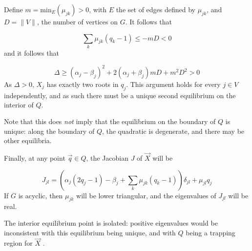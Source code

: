 \documentclass{article}
\begin{document}
Define $m = \mathrm{min}_E(\mu_{jk}) > 0$, with $E$ the set of edges defined by
$\mu_{jk}$, and $D = \|V\|$, the number of vertices on $G$. It follows that

\begin{equation}
    \sum_k \mu_{jk} (q_k - 1) \leq - m D < 0
\end{equation}
and it follows that

\begin{equation}
    \Delta \geq (\alpha_j - \beta_j)^2 + 2 (\alpha_j + \beta_j) m D + m^2 D^2 > 0
\end{equation}
As $\Delta > 0$, $X_j$ has exactly two roots in $q_j$. This argument holds for every
$j \in V$ independently, and as such there must be a unique second equilibrium on the
interior of $Q$.

Note that this does \emph{not} imply that the equilibrium on the boundary of $Q$
is unique: along the boundary of $Q$, the quadratic is degenerate, and there may
be other equilibria.

Finally, at any point $\vec{q} \in Q$, the Jacobian $J$ of $\vec{X}$ will be

\begin{equation}
    J_{jl} = \left(\alpha_j (2 q_j - 1) - \beta_j + \sum_k \mu_{jk} (q_k - 1)
    \right) \delta_{jl} + \mu_{jl} q_j
\end{equation}
If $G$ is acyclic, then $\mu_{jk}$ will be lower triangular, and the eigenvalues
of $J_{jl}$ will be real.

The interior equilibrium point is isolated: positive eigenvalues would be
inconsistent with this equilibrium being unique, and with $Q$ being a trapping
region for $\vec{X}$ \cite{frame2021mathematical}. 
\end{document}
